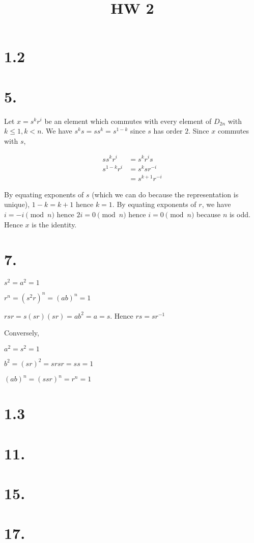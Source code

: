 \documentclass{article}
\title{HW 2}
\date{}
\begin{document}
\maketitle

\section*{1.2}

\section*{5.}


Let $x = s^kr^i$ be an element which commutes with every element of $D_{2n}$ with $k \le 1, k < n$. We have $s^k s = s s^k = s^{1-k}$ since $s$ has order $2$. Since $x$ commutes with $s$,



\begin{align*}
s s^kr^i &= s^kr^i s \\
s^{1-k} r^i &= s^k s r^{-i} \\
&= s^{k+1} r^{-i}
\end{align*}

By equating exponents of $s$ (which we can do because the representation is unique), $1-k = k+1$ hence $k=1$. By equating exponents of $r$, we have $i = -i \pmod n$ hence $2i = 0 \pmod n$ hence $i = 0 \pmod n$ because $n$ is odd. Hence $x$ is the identity.

\section*{7.}

$s^2 = a^2 = 1$

$r^n = (s^2 r)^n = (ab)^n = 1$

$rsr = s(sr)(sr) = ab^2 = a = s$. Hence $rs = sr^{-1}$

Conversely,

$a^2 = s^2 = 1$

$b^2 = (sr)^2 = srsr = ss = 1$

$(ab)^n = (ssr)^n = r^n = 1$

\section*{1.3}

\section*{11.}



\section*{15.}

\section*{17.}
\end{document}
